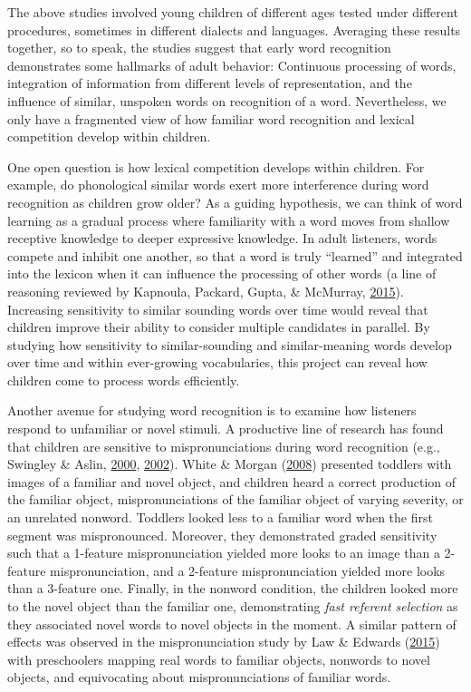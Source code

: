 \documentclass [11pt, proquest] {uwthesis}[2015/03/03]
\begin{document}
The above studies involved young children of different ages tested under
different procedures, sometimes in different dialects and languages.
Averaging these results together, so to speak, the studies suggest that
early word recognition demonstrates some hallmarks of adult behavior:
Continuous processing of words, integration of information from
different levels of representation, and the influence of similar,
unspoken words on recognition of a word. Nevertheless, we only have a
fragmented view of how familiar word recognition and lexical competition
develop within children.

One open question is how lexical competition develops within children.
For example, do phonological similar words exert more interference
during word recognition as children grow older? As a guiding hypothesis,
we can think of word learning as a gradual process where familiarity
with a word moves from shallow receptive knowledge to deeper expressive
knowledge. In adult listeners, words compete and inhibit one another, so
that a word is truly ``learned'' and integrated into the lexicon when it
can influence the processing of other words (a line of reasoning
reviewed by Kapnoula, Packard, Gupta, \& McMurray,
\protect\hyperlink{ref-Kapnoula2015}{2015}). Increasing sensitivity to
similar sounding words over time would reveal that children improve
their ability to consider multiple candidates in parallel. By studying
how sensitivity to similar-sounding and similar-meaning words develop
over time and within ever-growing vocabularies, this project can reveal
how children come to process words efficiently.

Another avenue for studying word recognition is to examine how listeners
respond to unfamiliar or novel stimuli. A productive line of research
has found that children are sensitive to mispronunciations during word
recognition (e.g., Swingley \& Aslin,
\protect\hyperlink{ref-Swingley2000}{2000},
\protect\hyperlink{ref-Swingley2002}{2002}). White \& Morgan
(\protect\hyperlink{ref-WhiteMorgan2008}{2008}) presented toddlers with
images of a familiar and novel object, and children heard a correct
production of the familiar object, mispronunciations of the familiar
object of varying severity, or an unrelated nonword. Toddlers looked
less to a familiar word when the first segment was mispronounced.
Moreover, they demonstrated graded sensitivity such that a 1-feature
mispronunciation yielded more looks to an image than a 2-feature
mispronunciation, and a 2-feature mispronunciation yielded more looks
than a 3-feature one. Finally, in the nonword condition, the children
looked more to the novel object than the familiar one, demonstrating
\emph{fast referent selection} as they associated novel words to novel
objects in the moment. A similar pattern of effects was observed in the
mispronunciation study by Law \& Edwards
(\protect\hyperlink{ref-MPPaper}{2015}) with preschoolers mapping real
words to familiar objects, nonwords to novel objects, and equivocating
about mispronunciations of familiar words.
\end{document}
